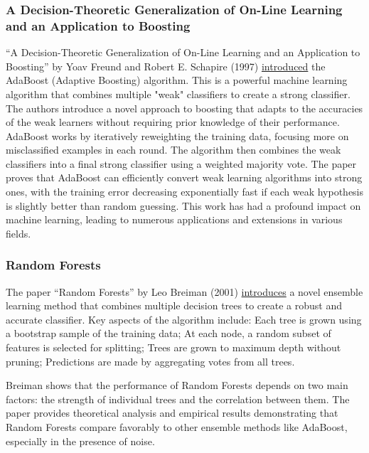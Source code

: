 \documentclass{article}
\begin{document}
\subsubsection*{A Decision-Theoretic Generalization of On-Line Learning and an Application to Boosting}

``A Decision-Theoretic Generalization of On-Line Learning and an Application to Boosting'' by Yoav Freund and Robert E. Schapire (1997) \href{https://www.face-rec.org/algorithms/Boosting-Ensemble/decision-theoretic_generalization.pdf}{introduced} the AdaBoost (Adaptive Boosting) algorithm.\cite{Freund1997} This is a powerful machine learning algorithm that combines multiple "weak" classifiers to create a strong classifier. The authors introduce a novel approach to boosting that adapts to the accuracies of the weak learners without requiring prior knowledge of their performance. AdaBoost works by iteratively reweighting the training data, focusing more on misclassified examples in each round. The algorithm then combines the weak classifiers into a final strong classifier using a weighted majority vote. The paper proves that AdaBoost can efficiently convert weak learning algorithms into strong ones, with the training error decreasing exponentially fast if each weak hypothesis is slightly better than random guessing. This work has had a profound impact on machine learning, leading to numerous applications and extensions in various fields.

\subsubsection*{Random Forests}

The paper ``Random Forests'' by Leo Breiman (2001) \href{https://link.springer.com/article/10.1023/A:1010933404324}{introduces} a novel ensemble learning method that combines multiple decision trees to create a robust and accurate classifier.\cite{Breiman2001} Key aspects of the algorithm include: Each tree is grown using a bootstrap sample of the training data; At each node, a random subset of features is selected for splitting; Trees are grown to maximum depth without pruning; Predictions are made by aggregating votes from all trees.

Breiman shows that the performance of Random Forests depends on two main factors: the strength of individual trees and the correlation between them. The paper provides theoretical analysis and empirical results demonstrating that Random Forests compare favorably to other ensemble methods like AdaBoost, especially in the presence of noise.
\end{document}
